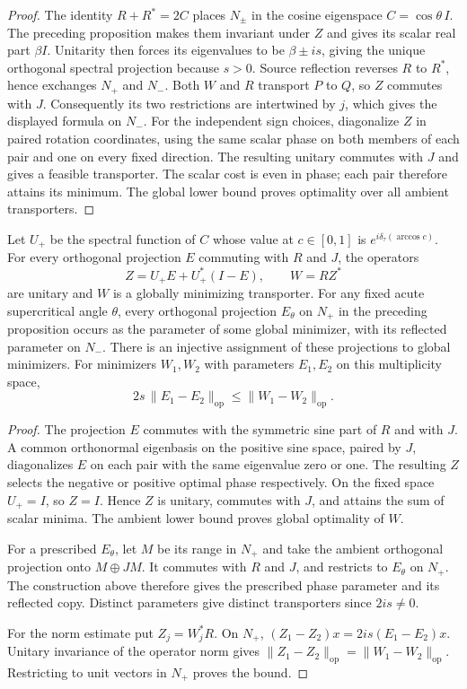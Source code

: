 \begin{proof}
The identity $R+R^*=2C$ places $N_\pm$ in the cosine eigenspace
$C=\cos\theta\,I$. The preceding proposition makes them invariant
under $Z$ and gives its scalar real part $\beta I$. Unitarity then
forces its eigenvalues to be $\beta\pm is$, giving the unique
orthogonal spectral projection because $s>0$.
Source reflection reverses $R$ to $R^*$, hence exchanges $N_+$ and
$N_-$. Both $W$ and $R$ transport $P$ to $Q$, so $Z$ commutes with
$J$. Consequently its two restrictions are intertwined by $j$,
which gives the displayed formula on $N_-$.
For the independent sign choices, diagonalize $Z$ in paired rotation
coordinates, using the same scalar phase on both members of each pair
and one on every fixed direction. The resulting unitary commutes with
$J$ and gives a feasible transporter. The scalar cost is even in phase;
each pair therefore attains its minimum. The global lower bound proves
optimality over all ambient transporters.
\end{proof}

\begin{proposition}
\label{prop:smoothed-projection-attainment}
Let $U_+$ be the spectral function of $C$ whose value at $c\in[0,1]$
is $e^{i\delta_\tau(\arccos c)}$. For every orthogonal projection $E$
commuting with $R$ and $J$, the operators
\[
 Z=U_+E+U_+^*(I-E),\qquad W=RZ^*
\]
are unitary and $W$ is a globally minimizing transporter.
For any fixed acute supercritical angle $\theta$, every orthogonal
projection $E_\theta$ on $N_+$ in the preceding proposition occurs
as the parameter of some global minimizer, with its reflected parameter
on $N_-$. There is an injective assignment of these projections to
global minimizers. For minimizers $W_1,W_2$ with parameters $E_1,E_2$
on this multiplicity space,
\[
 2s\,\|E_1-E_2\|_{\mathrm{op}}
 \leq \|W_1-W_2\|_{\mathrm{op}}.
\]
\end{proposition}

\begin{proof}
The projection $E$ commutes with the symmetric sine part of $R$ and
with $J$. A common orthonormal eigenbasis on the positive sine space,
paired by $J$, diagonalizes $E$ on each pair with the same eigenvalue
zero or one. The resulting $Z$ selects the negative or positive optimal
phase respectively. On the fixed space $U_+=I$, so $Z=I$. Hence $Z$
is unitary, commutes with $J$, and attains the sum of scalar minima.
The ambient lower bound proves global optimality of $W$.

For a prescribed $E_\theta$, let $M$ be its range in $N_+$ and take
the ambient orthogonal projection onto $M\oplus JM$. It commutes with
$R$ and $J$, and restricts to $E_\theta$ on $N_+$. The construction
above therefore gives the prescribed phase parameter and its reflected
copy. Distinct parameters give distinct transporters since $2is\ne0$.

For the norm estimate put $Z_j=W_j^*R$. On $N_+$,
$(Z_1-Z_2)x=2is(E_1-E_2)x$. Unitary invariance of the operator norm
gives $\|Z_1-Z_2\|_{\mathrm{op}}=\|W_1-W_2\|_{\mathrm{op}}$.
Restricting to unit vectors in $N_+$ proves the bound.
\end{proof}

